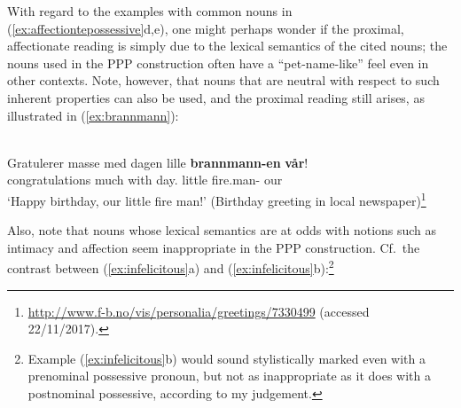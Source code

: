 \documentclass[output=paper]{langsci/langscibook}
\begin{document}
\ea\label{ex:speech} 

	 		\z
\z

\noindent With regard to the examples with common nouns  in
(\ref{ex:affectiontepossessive}d,e), one might perhaps wonder if the proximal,
affectionate reading is simply due to the lexical semantics of the cited nouns;
the nouns used in the PPP construction often have a ``pet-name-like''  feel
even in other contexts. Note, however, that nouns that are neutral with
respect to such inherent properties can also be used, and the  proximal reading
still arises, as illustrated in (\ref{ex:brannmann}):

\ea\label{ex:brannmann} \\
	\gll  Gratulerer masse med dagen  lille \textbf{brannmann-en} \textbf{vår}!\\
	congratulations much with day.\Def{} little fire.man-\Def{} our\\
    \glt `Happy birthday, our little fire man!' (Birthday greeting in local
    newspaper)\footnote{\url{http://www.f-b.no/vis/personalia/greetings/7330499}
    (accessed 22/11/2017).}
\z

\noindent Also, note that nouns whose lexical semantics are at odds with
notions such as intimacy and affection seem inappropriate in the PPP
construction. Cf.\ the contrast between (\ref{ex:infelicitous}a) and
(\ref{ex:infelicitous}b):\footnote{Example (\ref{ex:infelicitous}b)
    would sound stylistically marked even with a prenominal possessive pronoun,
    but not as inappropriate as it does with a postnominal possessive,
according to my judgement.}

\ea\label{ex:infelicitous} 
\end{document}
